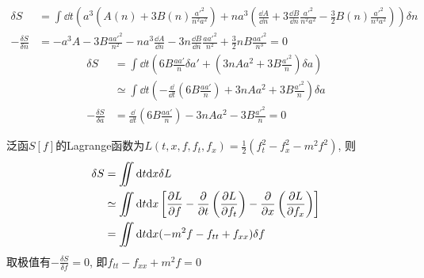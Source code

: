 \begin{solution}
    \[
        \begin{aligned}
            \delta S & = \int \dd t \left(a^3\left(A(n) + 3B(n) \frac{a'^2}{n^2 a^2}\right) + n a^3 \left(\frac{\dd A}{\dd n} + 3\frac{\dd B}{\dd n}\frac{a'^2}{n^2 a^2} - \frac{3}{2}B(n)\frac{a'^2}{n^3 a^2}\right)\right) \delta n\\
            -\frac{\delta S}{\delta n} & = -a^3 A - 3B \frac{a a'^2}{n^2} - n a^3 \frac{\dd A}{\dd n} - 3n \frac{\dd B}{\dd n} \frac{a a'^2}{n^2} + \frac{3}{2}nB\frac{a a'^2}{n^3} = 0
        \end{aligned}
    \]
    \[
        \begin{aligned}
            \delta S & = \int \dd t \left(6 B \frac{a a'}{n} \delta a' + \left(3 n A a^2 + 3 B \frac{a'^2}{n}\right)\delta a\right) \\
            & \simeq \int \dd t \left(- \frac{\dd}{\dd t}\left(6 B \frac{a a'}{n}\right) + 3 n A a^2 + 3 B \frac{a'^2}{n}\right) \delta a \\
            - \frac{\delta S}{\delta a} & = \frac{\dd}{\dd t}\left(6 B \frac{a a'}{n}\right) - 3 n A a^2 - 3 B \frac{a'^2}{n} = 0
        \end{aligned}
    \]
\end{solution}

\begin{solution}
    泛函\(S[f]\)的Lagrange函数为\(L(t,x,f,f_t,f_x) = \frac12(f_t^2-f_x^2-m^2f^2)\), 则
    \[
    \begin{aligned}
        \delta S & = \iint \dd t \dd x \delta L \\
                 & \simeq \iint \dd t \dd x \left[
                    \frac{\partial L}{\partial f} - \frac{\partial}{\partial t}\left( \frac{\partial L}{\partial f_t} \right) - \frac{\partial}{\partial x}\left( \frac{\partial L}{\partial f_x} \right)
                    \right] \\
                 & = \iint \dd t \dd x  
                 (-m^2f - f_{tt} + f_{xx})
                 \delta f
    \end{aligned}
    \]
    取极值有\(-\frac{\delta S}{\delta f}=0\), 即\(f_{tt} - f_{xx} + m^2f = 0\)
\end{solution}

